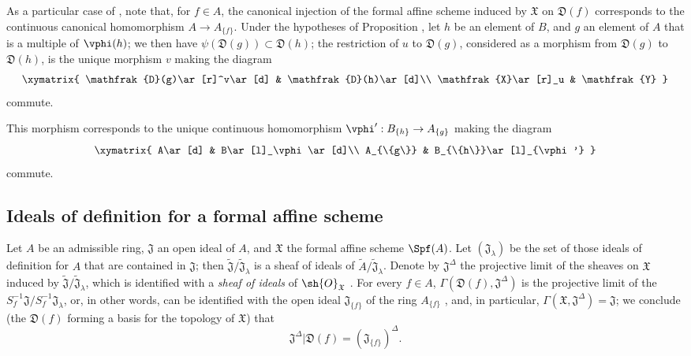 \begin{env}[10.2.3]
\label{I.10.2.3}
As a particular case of , note that, for $f\in A$, the canonical injection of the formal affine scheme induced by $\mathfrak{X}$ on $\mathfrak{D}(f)$ corresponds to the continuous canonical homomorphism $A\to A_{\{f\}}$.
Under the hypotheses of Proposition , let $h$ be an element of $B$, and $g$ an element of $A$ that is a multiple of $\vphi(h)$;
we then have $\psi(\mathfrak{D}(g))\subset\mathfrak{D}(h)$; the restriction of $u$ to $\mathfrak{D}(g)$, considered as a morphism from $\mathfrak{D}(g)$ to $\mathfrak{D}(h)$, is the unique morphism $v$ making the diagram
\[
  \xymatrix{
    \mathfrak{D}(g)\ar[r]^v\ar[d] &
    \mathfrak{D}(h)\ar[d]\\
    \mathfrak{X}\ar[r]_u &
    \mathfrak{Y}
  }
\]
commute.

This morphism corresponds to the unique continuous homomorphism $\vphi':B_{\{h\}}\to A_{\{g\}}$  making the diagram
\[
  \xymatrix{
    A\ar[d] &
    B\ar[l]_\vphi\ar[d]\\
    A_{\{g\}} &
    B_{\{h\}}\ar[l]_{\vphi'}
  }
\]
commute.
\end{env}

\subsection{Ideals of definition for a formal affine scheme}
\label{subsection:I.10.3}

\begin{env}[10.3.1]
\label{I.10.3.1}
Let $A$ be an admissible ring, $\mathfrak{J}$ an open ideal of $A$, and $\mathfrak{X}$ the formal affine scheme $\Spf(A)$.
Let $(\mathfrak{J}_\lambda)$ be the set of those ideals of definition for $A$ that are contained in $\mathfrak{J}$; then $\widetilde{\mathfrak{J}}/\widetilde{\mathfrak{J}}_\lambda$ is a sheaf of ideals of $\widetilde{A}/\widetilde{\mathfrak{J}}_\lambda$.
Denote by $\mathfrak{J}^\Delta$ the projective limit of the sheaves on $\mathfrak{X}$ induced by $\widetilde{\mathfrak{J}}/\widetilde{\mathfrak{J}}_\lambda$, which is identified with a \emph{sheaf of ideals} of $\sh{O}_\mathfrak{X}$ .
For every $f\in A$, $\Gamma(\mathfrak{D}(f),\mathfrak{J}^\Delta)$ is the projective limit of the $S_f^{-1}\mathfrak{J}/S_f^{-1}\mathfrak{J}_\lambda$, or, in other words, can be identified with the open ideal $\mathfrak{J}_{\{f\}}$ of the ring $A_{\{f\}}$ , and, in particular, $\Gamma(\mathfrak{X},\mathfrak{J}^\Delta)=\mathfrak{J}$; we conclude (the $\mathfrak{D}(f)$ forming a basis for the topology of $\mathfrak{X}$) that
\[
\label{I.10.3.1.1}
  \mathfrak{J}^\Delta|\mathfrak{D}(f)=(\mathfrak{J}_{\{f\}})^\Delta.
  \tag{10.3.1.1}
\]
\end{env}

